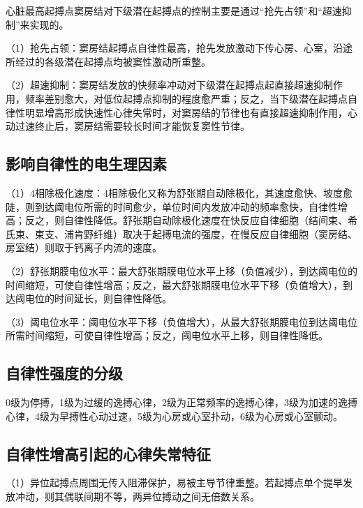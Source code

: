 心脏最高起搏点窦房结对下级潜在起搏点的控制主要是通过“抢先占领”和“超速抑制”来实现的。

（1）抢先占领：窦房结起搏点自律性最高，抢先发放激动下传心房、心室，沿途所经过的各级潜在起搏点均被窦性激动所重整。

（2）超速抑制：窦房结发放的快频率冲动对下级潜在起搏点起直接超速抑制作用，频率差别愈大，对低位起搏点抑制的程度愈严重；反之，当下级潜在起搏点自律性明显增高形成快速性心律失常时，对窦房结的节律也有直接超速抑制作用，心动过速终止后，窦房结需要较长时间才能恢复窦性节律。

\protect\hypertarget{text00022.htmlux5cux23subid254}{}{}

\subsection{影响自律性的电生理因素}

（1）4相除极化速度：4相除极化又称为舒张期自动除极化，其速度愈快、坡度愈陡，则到达阈电位所需的时间愈少，单位时间内发放冲动的频率愈快，自律性增高；反之，则自律性降低。舒张期自动除极化速度在快反应自律细胞（结间束、希氏束、束支、浦肯野纤维）取决于起搏电流的强度，在慢反应自律细胞（窦房结、房室结）则取于钙离子内流的速度。

（2）舒张期膜电位水平：最大舒张期膜电位水平上移（负值减少），到达阈电位的时间缩短，可使自律性增高；反之，最大舒张期膜电位水平下移（负值增大），到达阈电位的时间延长，则自律性降低。

（3）阈电位水平：阈电位水平下移（负值增大），从最大舒张期膜电位到达阈电位所需时间缩短，可使自律性增高；反之，阈电位水平上移，则自律性降低。

\protect\hypertarget{text00022.htmlux5cux23subid255}{}{}

\subsection{自律性强度的分级}

0级为停搏，1级为过缓的逸搏心律，2级为正常频率的逸搏心律，3级为加速的逸搏心律，4级为早搏性心动过速，5级为心房或心室扑动，6级为心房或心室颤动。

\protect\hypertarget{text00022.htmlux5cux23subid256}{}{}

\subsection{自律性增高引起的心律失常特征}

（1）异位起搏点周围无传入阻滞保护，易被主导节律重整。若起搏点单个提早发放冲动，则其偶联间期不等，两异位搏动之间无倍数关系。


